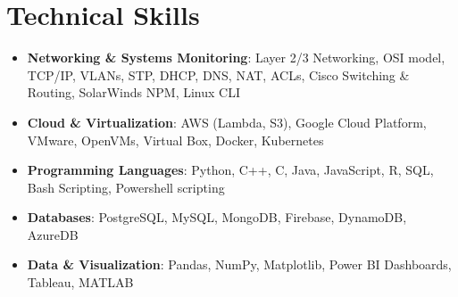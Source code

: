 \documentclass[letterpaper,11pt]{article}
\newcommand{\resumeItem}[1]{\item\small{#1 \vspace{-4pt}}}  %
\newcommand{\resumeSubItem}[1]{\resumeItem{#1}\vspace{-4pt}}
\newcommand{\resumeSubHeadingListStart}{\begin{itemize}[leftmargin=0.0in, label={}]}
\newcommand{\resumeSubHeadingListEnd}{\end{itemize}}
\begin{document}
\section{Technical Skills}
\resumeSubHeadingListStart
\resumeSubItem{\textbf{Networking \& Systems Monitoring}{: Layer 2/3 Networking, OSI model, TCP/IP, VLANs, STP, DHCP, DNS, NAT, ACLs, Cisco Switching \& Routing, SolarWinds NPM, Linux CLI}}
\vspace{4pt} 
\resumeSubItem{\textbf{Cloud \& Virtualization}{: AWS (Lambda, S3), Google Cloud Platform, VMware, OpenVMs, Virtual Box, Docker, Kubernetes}}
\vspace{4pt}
\resumeSubItem{\textbf{Programming Languages}{: Python, C++, C, Java, JavaScript, R, SQL, Bash Scripting, Powershell scripting}}
\vspace{4pt}
\resumeSubItem{\textbf{Databases}{: PostgreSQL, MySQL, MongoDB, Firebase, DynamoDB, AzureDB}}
\vspace{4pt}
\resumeSubItem{\textbf{Data \& Visualization}{: Pandas, NumPy, Matplotlib, Power BI Dashboards, Tableau, MATLAB}}
\resumeSubHeadingListEnd
\end{document}
